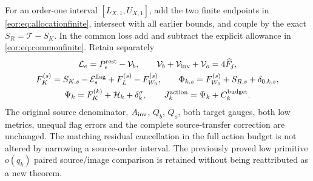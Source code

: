 \documentclass[11pt,a4paper]{article}
\begin{document}
For an order-one interval $[L_{X,1},U_{X,1}]$, add the two finite endpoints in
\eqref{eor:eq:allocationfinite}, intersect with all earlier bounds, and couple by
the exact $S_R=\mathcal T-S_K$. In the common loss add and subtract the explicit
allowance in \eqref{eor:eq:commonfinite}. Retain separately
\begin{equation}
\begin{gathered}
 \mathcal L_e=P_e^{\rm rest}-\mathcal V_b,\qquad
 \mathcal V_b+\mathcal V_{\rm inv}+\mathcal V_o=4\widehat F_j,\\
 F_K^{(s)}=S_{K,s}-\mathcal E_s^{\rm flag}+F_L^{(s)}-F_{W_0}^{(s)},
 \qquad \Phi_{k,s}=F_{W_0}^{(s)}+S_{R,s}+\delta_{0,k,s},\\
 \Psi_k=F_K^{(k)}+\mathcal H_k+\delta_k^\sigma,
 \qquad J_k^{\rm action}=\Psi_k+C_k^{\rm budget}.
\end{gathered}\label{eor:eq:receivers}
\end{equation}
The original source denominator, $A_{\rm inv}$, $Q_b$, $Q_o$, both target gauges,
both low metrics, unequal flag errors and the complete source-transfer correction
are unchanged. The matching residual cancellation in the full action budget
is not altered by narrowing a source-order interval. The previously proved
low primitive $o(q_k)$ paired source/image comparison is retained without
being reattributed as a new theorem.
\end{document}
